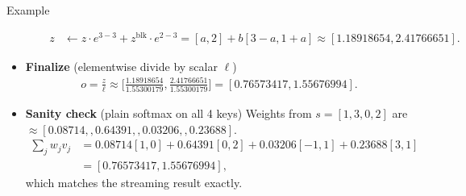 \begin{commentbox}{Example}
\begin{itemize}
\begin{itemize}
\begin{align*}
				  z &\leftarrow z\cdot e^{3-3} + z^{\text{blk}}\cdot e^{2-3}
				  = [a,2] + b[3-a,1+a] \approx \boxed{[1.18918654,2.41766651]}.
				\end{align*}
		\end{itemize}
	\item \textbf{Finalize} (elementwise divide by scalar $\ell$)
		\begin{align*}
			o=\frac{z}{\ell}
			\approx \Big[\frac{1.18918654}{1.55300179},\frac{2.41766651}{1.55300179}\Big]
			= \boxed{[0.76573417,1.55676994]}.
		\end{align*}
	\item \textbf{Sanity check} (plain softmax on all 4 keys)
		Weights from $s=[1,3,0,2]$ are $\approx[0.08714,,0.64391,,0.03206,,0.23688]$.
		\begin{align*}
			\sum_j w_j v_j
			&= 0.08714[1,0]+0.64391[0,2]+0.03206[-1,1]+0.23688[3,1]\\
			&= [0.76573417,1.55676994],
		\end{align*}
		which matches the streaming result exactly. 
\end{itemize}
\end{commentbox}






